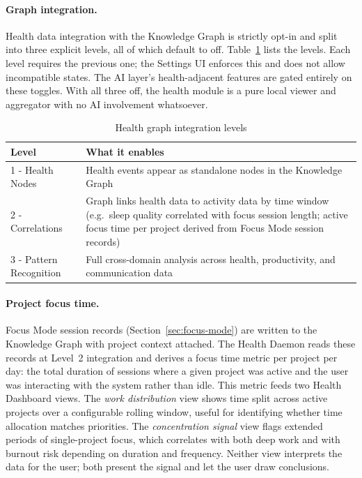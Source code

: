 \paragraph{Graph integration.}
Health data integration with the Knowledge Graph is strictly opt-in and split
into three explicit levels, all of which default to off.
Table~\ref{tab:health-graph} lists the levels. Each level requires the
previous one; the Settings UI enforces this and does not allow incompatible
states. The AI layer's health-adjacent features are gated entirely on these
toggles. With all three off, the health module is a pure local viewer and
aggregator with no AI involvement whatsoever.

\begin{table}[htbp]
\caption{Health graph integration levels}
\label{tab:health-graph}
\begin{tabularx}{\linewidth}{lX}
\toprule
\textbf{Level} & \textbf{What it enables} \\
\midrule
1 - Health Nodes     &
  Health events appear as standalone nodes in the Knowledge Graph \\
2 - Correlations     &
  Graph links health data to activity data by time window
  (e.g.\ sleep quality correlated with focus session length;
  active focus time per project derived from Focus Mode session records) \\
3 - Pattern Recognition &
  Full cross-domain analysis across health, productivity, and
  communication data \\
\bottomrule
\end{tabularx}
\end{table}

\paragraph{Project focus time.}
Focus Mode session records (Section~\ref{sec:focus-mode}) are written to the
Knowledge Graph with project context attached. The Health Daemon reads these
records at Level~2 integration and derives a focus time metric per project per
day: the total duration of sessions where a given project was active and the
user was interacting with the system rather than idle. This metric feeds two
Health Dashboard views. The \emph{work distribution} view shows time split
across active projects over a configurable rolling window, useful for
identifying whether time allocation matches priorities. The \emph{concentration
signal} view flags extended periods of single-project focus, which correlates
with both deep work and with burnout risk depending on duration and frequency.
Neither view interprets the data for the user; both present the signal and let
the user draw conclusions.

